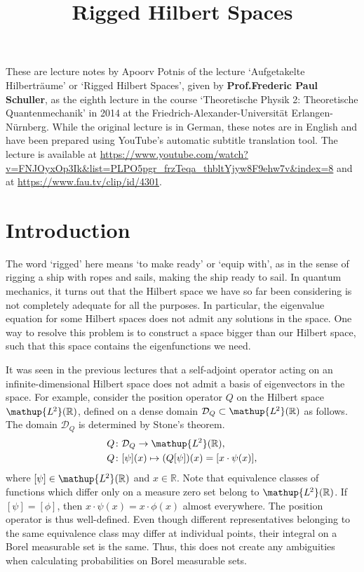 \documentclass[12pt, a4 paper]{article}
\title{Rigged Hilbert Spaces}
\author{}
\date{\vspace{-5ex}}
\theoremstyle{definition}
\newcommand{\ltwo}{\mathup{L\kern-0.5pt^2}}
\newcommand{\position}{Q}
\newcommand{\rr}{\mathbb{R}}
\newcommand{\ltwor}{\ltwo(\rr)}
\newcommand{\domain}{\mathcal{D}}
\begin{document}
	\maketitle

	These are lecture notes by Apoorv Potnis of the lecture `Aufgetakelte Hilberträume' or `Rigged Hilbert Spaces', given by \textbf{Prof.\@ Frederic Paul Schuller}, as the eighth lecture in the course `Theoretische Physik 2: Theoretische Quantenmechanik' in 2014 at the Friedrich-Alexander-Universität Erlangen-Nürnberg. While the original lecture is in German, these notes are in English and have been prepared using YouTube's automatic subtitle translation tool. The lecture is available at \url{https://www.youtube.com/watch?v=FNJOyxOp3Ik&list=PLPO5pgr_frzTeqa_thbltYjyw8F9ehw7v&index=8} and at \url{https://www.fau.tv/clip/id/4301}.

	\tableofcontents

	\section{Introduction}

	The word `rigged' here means `to make ready' or `equip with', as in the sense of rigging a ship with ropes and sails, making the ship ready to sail. In quantum mechanics, it turns out that the Hilbert space we have so far been considering is not completely adequate for all the purposes. In particular, the eigenvalue equation for some Hilbert spaces does not admit any solutions in the space. One way to resolve this problem is to construct a space bigger than our Hilbert space, such that this space contains the eigenfunctions we need.

	It was seen in the previous lectures that a self-adjoint operator acting on an infinite-dimensional Hilbert space does not admit a basis of eigenvectors in the space. For example, consider the position operator $\position$ on the Hilbert space \(\ltwor\), defined on a dense domain \(\domain_{\position} \subset \ltwor\) as follows. The domain $\domain_{\position}$ is determined by Stone's  theorem.
	\begin{align*}
		\position &\colon \domain_\position \rightarrow \ltwor,\\
		\position &\colon [\psi](x) \mapsto (\position[\psi])(x) = [x \cdot \psi(x)],
	\end{align*}
	where \([\psi] \in \ltwor\) and \(x \in \rr\). Note that equivalence classes of functions which differ only on a measure zero set belong to \(\ltwor\). If $[\psi] = [\phi]$, then $x \cdot \psi(x) = x \cdot \phi(x)$ almost everywhere. The position operator is thus well-defined. Even though different representatives belonging to the same equivalence class may differ at individual points, their integral on a Borel measurable set is the same. Thus, this does not create any ambiguities when calculating probabilities on Borel measurable sets.
\end{document}
